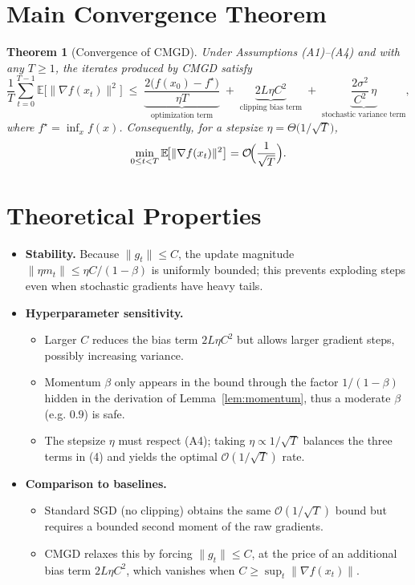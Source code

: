 \documentclass{article}
\newtheorem{theorem}{Theorem}
\newcommand{\EE}{\mathbb{E}}
\begin{document}
\section*{Main Convergence Theorem}
\begin{theorem}[Convergence of CMGD]\label{thm:main}
Under Assumptions (A1)–(A4) and with any $T\ge1$, the iterates produced by
CMGD satisfy
\[
\frac{1}{T}\sum_{t=0}^{T-1}\EE\!\big[\|\nabla f(x_t)\|^{2}\big]
\;\le\;
\underbrace{\frac{2\big(f(x_{0})-f^{\star}\big)}{\eta T}}_{\text{optimization term}}
\;+\;
\underbrace{2L\eta C^{2}}_{\text{clipping bias term}}
\;+\;
\underbrace{\frac{2\sigma^{2}}{C^{2}}\,\eta}_{\text{stochastic variance term}},
\tag{4}
\]
where $f^{\star}=\inf_{x}f(x)$.
Consequently, for a stepsize $\eta =\Theta\bigl(1/\sqrt{T}\bigr)$,
\[
\min_{0\le t<T}\EE\!\big[\|\nabla f(x_t)\|^{2}\big]=\mathcal O\!\Bigl(\frac{1}{\sqrt{T}}\Bigr).
\]
\end{theorem}

\section*{Theoretical Properties}
\begin{itemize}
\item \textbf{Stability.} Because $\|g_t\|\le C$, the update magnitude
$\|\eta m_t\|\le \eta C/(1-\beta)$ is uniformly bounded; this prevents
exploding steps even when stochastic gradients have heavy tails.

\item \textbf{Hyperparameter sensitivity.}
  \begin{itemize}
  \item Larger $C$ reduces the bias term $2L\eta C^{2}$ but allows larger
        gradient steps, possibly increasing variance.
  \item Momentum $\beta$ only appears in the bound through the factor
        $1/(1-\beta)$ hidden in the derivation of Lemma~\ref{lem:momentum},
        thus a moderate $\beta$ (e.g. $0.9$) is safe.
  \item The stepsize $\eta$ must respect (A4); taking $\eta\propto 1/\sqrt{T}$
        balances the three terms in (4) and yields the optimal
        $\mathcal O(1/\sqrt{T})$ rate.
  \end{itemize}

\item \textbf{Comparison to baselines.}
  \begin{itemize}
  \item Standard SGD (no clipping) obtains the same $\mathcal O(1/\sqrt{T})$
        bound but requires a bounded second moment of the raw gradients.
  \item CMGD relaxes this by forcing $\|g_t\|\le C$, at the price of an
        additional bias term $2L\eta C^{2}$, which vanishes when
        $C\ge\sup_t\|\nabla f(x_t)\|$.
  \end{itemize}
\end{itemize}
\end{document}
